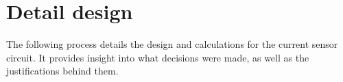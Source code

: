 \graphicspath{{content/figures/}}
\chapter{Detail design}\label{ch:detail_design}
The following process details the design and calculations for the current sensor circuit. It provides insight into
what decisions were made, as well as the justifications behind them.

